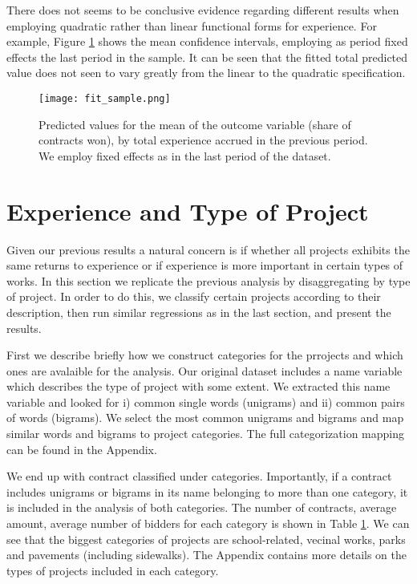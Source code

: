 There does not seems to be conclusive evidence regarding different results when employing quadratic rather than linear functional forms for experience. For example, Figure \ref{fig:pred_average} shows the mean confidence intervals, employing as period fixed effects the last period in the sample. It can be seen that the fitted total predicted value does not seen to vary greatly from the linear to the quadratic specification.

\begin{figure}[H]
        \centering
        \texttt{[image: fit\_sample.png]}
        \caption{ \small Predicted values for the mean of the outcome variable (share of contracts won), by total experience accrued in the previous period. We employ fixed effects as in the last period of the dataset.}
        \label{fig:pred_average}
    \end{figure}




\section{Experience and Type of Project}
Given our previous results a natural concern is if whether all projects exhibits the same returns to experience or if experience is more important in certain types of works. In this section we replicate the previous analysis by disaggregating by type of project. In order to do this, we classify certain projects according to their description, then run similar regressions as in the last section, and present the results.

First we describe briefly how we construct categories for the prrojects and which ones are avalaible for the analysis. Our original dataset includes a name variable which describes the type of project with some extent. We extracted this name variable and looked for i) common single words (unigrams) and ii) common pairs of words (bigrams). We select the most common unigrams and bigrams and map similar words and bigrams to project categories. The full categorization mapping can be found in the Appendix.

We end up with contract classified under categories. Importantly, if a contract includes unigrams or bigrams in its name belonging to more than one category, it is included in the analysis of both categories. The number of contracts, average amount, average number of bidders for each category is shown in Table \ref{}. We can see that the biggest categories of projects are school-related, vecinal works, parks and pavements (including sidewalks). The Appendix contains more details on the types of projects included in each category.

